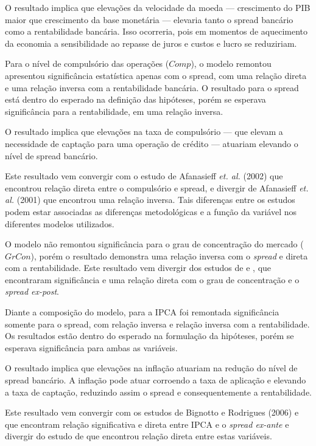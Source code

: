\documentclass[
  12pt,
  12pt,
  openright,
  oneside,
  a4paper,
  chapter=TITLE,
  section=TITLE,
  subsection=TITLE,
  subsubsection=TITLE,
  english,
  portugues,
  sumario=tradicional]{abntex2}
\begin{document}
O resultado implica que elevações da velocidade da moeda --- crescimento do PIB maior que crescimento da base monetária --- elevaria tanto o spread bancário como a rentabilidade bancária. Isso ocorreria, pois em momentos de aquecimento da economia a sensibilidade ao repasse de juros e custos e lucro se reduziriam.

Para o nível de compulsório das operações (\(Comp\)), o modelo remontou apresentou significância estatística apenas com o spread, com uma relação direta e uma relação inversa com a rentabilidade bancária. O resultado para o spread está dentro do esperado na definição das hipóteses, porém se esperava significância para a rentabilidade, em uma relação inversa.

O resultado implica que elevações na taxa de compulsório --- que elevam a necessidade de captação para uma operação de crédito --- atuariam elevando o nível de spread bancário.

Este resultado vem convergir com o estudo de Afanasieff \emph{et. al.} (2002) que encontrou relação direta entre o compulsório e spread, e divergir de Afanasieff \emph{et. al.} (2001) que encontrou uma relação inversa. Tais diferenças entre os estudos podem estar associadas as diferenças metodológicas e a função da variável nos diferentes modelos utilizados.

O modelo não remontou significância para o grau de concentração do mercado (\(GrCon\)), porém o resultado demonstra uma relação inversa com o \emph{spread} e direta com a rentabilidade. Este resultado vem divergir dos estudos de \textcite{dantas:2012} e \textcite{almeida:2013}, que encontraram significância e uma relação direta com o grau de concentração e o \emph{spread ex-post}.

Diante a composição do modelo, para a IPCA foi remontada significância somente para o spread, com relação inversa e relação inversa com a rentabilidade. Os resultados estão dentro do esperado na formulação da hipóteses, porém se esperava significância para ambas as variáveis.

O resultado implica que elevações na inflação atuariam na redução do nível de spread bancário. A inflação pode atuar corroendo a taxa de aplicação e elevando a taxa de captação, reduzindo assim o spread e consequentemente a rentabilidade.

Este resultado vem convergir com os estudos de Bignotto e Rodrigues (2006) e \textcite{durigan:2018} que encontram relação significativa e direta entre IPCA e o \emph{spread ex-ante} e divergir do estudo de \textcite{aronovich:1994} que encontrou relação direta entre estas variáveis.
\end{document}
